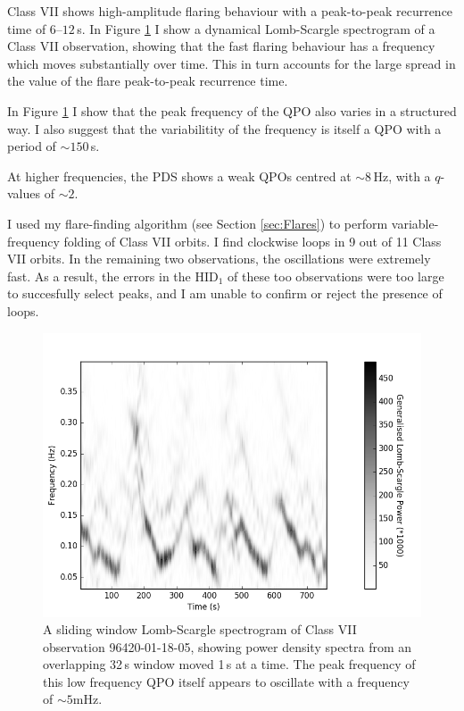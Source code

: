 \par Class VII shows high-amplitude flaring behaviour with a peak-to-peak recurrence time of $6$--$12$\,s.  In Figure \ref{fig:spect} I show a dynamical Lomb-Scargle spectrogram of a Class VII observation, showing that the fast flaring behaviour has a frequency which moves substantially over time.  This in turn accounts for the large spread in the value of the flare peak-to-peak recurrence time.
\par In Figure \ref{fig:spect} I show that the peak frequency of the QPO also varies in a structured way.  I also suggest that the variabilitity of the frequency is itself a QPO with a period of $\sim150$\,s.
\par At higher frequencies, the PDS shows a weak QPOs centred at $\sim8$\,Hz, with a $q$-values of $\sim2$.
\par I used my flare-finding algorithm (see Section \ref{sec:Flares}) to perform variable-frequency folding of Class VII orbits.  I find clockwise loops in 9 out of 11 Class VII orbits.  In the remaining two observations, the oscillations were extremely fast.  As a result, the errors in the HID$_1$ of these too observations were too large to succesfully select peaks, and I am unable to confirm or reject the presence of loops.

\begin{figure}
    \includegraphics[width=0.8\columnwidth, trim = 0.6cm 0 3.9cm 0]{images/N_sgram.png}
    \captionsetup{singlelinecheck=off}
    \caption[A sliding window Lomb-Scargle spectrogram of Class VII observation 96420-01-18-05.]{A sliding window Lomb-Scargle spectrogram of Class VII observation 96420-01-18-05, showing power density spectra from an overlapping 32\,s window moved 1\,s at a time.  The peak frequency of this low frequency QPO itself appears to oscillate with a frequency of $\sim5$mHz.}
   \label{fig:spect}
\end{figure}

